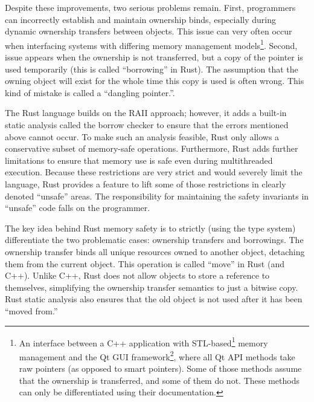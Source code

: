 \documentclass[
  11pt,
  twoside,symmetric]{report}
\DeclareRobustCommand{\href}[2]{#2\footnote{\url{#1}}}
\begin{document}
Despite these improvements, two serious problems remain. First,
programmers can incorrectly establish and maintain ownership binds,
especially during dynamic ownership transfers between objects. This
issue can very often occur when interfacing systems with differing
memory management models\footnote{An interface between a C++ application
  with
  \href{https://www.cppreference.com/Cpp_STL_ReferenceManual.pdf}{STL-based}
  memory management and the \href{https://www.qt.io/}{Qt GUI framework},
  where all Qt API methods take raw pointers (as opposed to smart
  pointers). Some of those methods assume that the ownership is
  transferred, and some of them do not. These methods can only be
  differentiated using their documentation.}. Second, issue appears when
the ownership is not transferred, but a copy of the pointer is used
temporarily (this is called ``borrowing'' in Rust). The assumption that
the owning object will exist for the whole time this copy is used is
often wrong. This kind of mistake is called a ``dangling
pointer.''.

The Rust language builds on the RAII approach; however, it adds a
built-in static analysis called the borrow checker to ensure that the
errors mentioned above cannot occur. To make such an analysis feasible,
Rust only allows a conservative subset of memory-safe operations.
Furthermore, Rust adds further limitations to ensure that memory use is
safe even during multithreaded execution. Because these restrictions are
very strict and would severely limit the language, Rust provides a
feature to lift some of those restrictions in clearly denoted ``unsafe''
areas. The responsibility for maintaining the safety invariants in
``unsafe'' code falls on the programmer.

The key idea behind Rust memory safety is to strictly (using the type
system) differentiate the two problematic cases: ownership transfers and
borrowings. The ownership transfer binds all unique resources owned to
another object, detaching them from the current object. This operation
is called ``move'' in Rust (and C++). Unlike C++, Rust does not allow
objects to store a reference to themselves, simplifying the ownership
transfer semantics to just a bitwise copy. Rust static analysis also
ensures that the old object is not used after it has been ``moved
from.''
\end{document}
